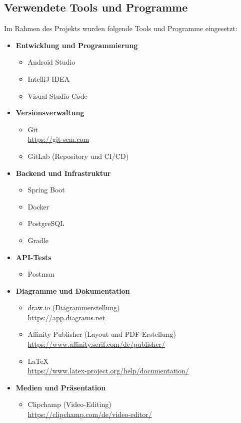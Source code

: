 \newpage

\subsection{Verwendete Tools und Programme}

Im Rahmen des Projekts wurden folgende Tools und Programme eingesetzt:

\begin{itemize}

  \item \textbf{Entwicklung und Programmierung}
  \begin{itemize}
    \item Android Studio
    \item IntelliJ IDEA
    \item Visual Studio Code
  \end{itemize}

  \item \textbf{Versionsverwaltung}
  \begin{itemize}
    \item Git \\
    \url{https://git-scm.com}
    \item GitLab (Repository und CI/CD)
  \end{itemize}

  \item \textbf{Backend und Infrastruktur}
  \begin{itemize}
    \item Spring Boot
    \item Docker
    \item PostgreSQL
    \item Gradle
  \end{itemize}

  \item \textbf{API-Tests}
  \begin{itemize}
    \item Postman
  \end{itemize}

  \item \textbf{Diagramme und Dokumentation}
  \begin{itemize}
    \item draw.io (Diagrammerstellung) \\
    \url{https://app.diagrams.net}
    \item Affinity Publisher (Layout und PDF-Erstellung) \\
    \url{https://www.affinity.serif.com/de/publisher/}
    \item LaTeX \\
    \url{https://www.latex-project.org/help/documentation/}
  \end{itemize}

  \item \textbf{Medien und Präsentation}
  \begin{itemize}
    \item Clipchamp (Video-Editing) \\
    \url{https://clipchamp.com/de/video-editor/}
  \end{itemize}

\end{itemize}